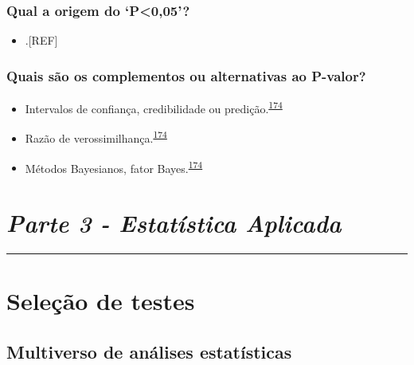 \documentclass[
  a4paper,
]{book}
\providecommand{\tightlist}{%
  \setlength{\itemsep}{0pt}\setlength{\parskip}{0pt}}
\begin{document}
\hypertarget{qual-a-origem-do-p005}{%
\subsection{Qual a origem do `P\textless0,05'?}\label{qual-a-origem-do-p005}}

\begin{itemize}
\tightlist
\item
  .{[}REF{]}
\end{itemize}

\hypertarget{quais-suxe3o-os-complementos-ou-alternativas-ao-p-valor}{%
\subsection{Quais são os complementos ou alternativas ao P-valor?}\label{quais-suxe3o-os-complementos-ou-alternativas-ao-p-valor}}

\begin{itemize}
\item
  Intervalos de confiança, credibilidade ou predição.\textsuperscript{\protect\hyperlink{ref-wasserstein2016}{174}}
\item
  Razão de verossimilhança.\textsuperscript{\protect\hyperlink{ref-wasserstein2016}{174}}
\item
  Métodos Bayesianos, fator Bayes.\textsuperscript{\protect\hyperlink{ref-wasserstein2016}{174}}
\end{itemize}


\hypertarget{parte-3---estatuxedstica-aplicada}{%
\chapter*{\texorpdfstring{\emph{Parte 3 - Estatística Aplicada}}{Parte 3 - Estatística Aplicada}}\label{parte-3---estatuxedstica-aplicada}}

\markboth{}{}
\par\noindent\rule{\textwidth}{0.05in}

\hypertarget{selecao-testes}{%
\chapter{\texorpdfstring{\textbf{Seleção de testes}}{Seleção de testes}}\label{selecao-testes}}

\hypertarget{multiverso-estatistica}{%
\section{Multiverso de análises estatísticas}\label{multiverso-estatistica}}
\end{document}
